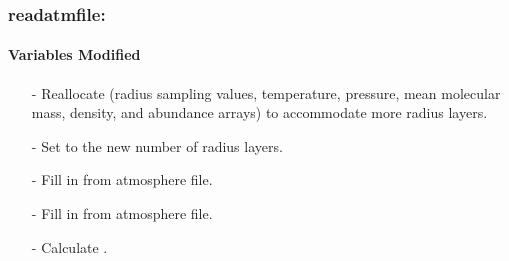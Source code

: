 \documentclass[letterpaper,12pt]{article}
\begin{document}
\subsubsection{readatmfile:}
\paragraph{Variables Modified}
\begin{enumerate}[leftmargin=10pt, noitemsep, parsep=0pt, topsep=0ex]
\item[-] Reallocate  (radius sampling values, temperature, pressure, mean molecular mass, density, and abundance arrays) to accommodate more radius layers.
\item[-] Set  to the new number of radius layers.
\item[-] Fill in  from atmosphere file.
\item[-] Fill in  from atmosphere file.
\item[-] Calculate .
\end{enumerate}
\end{document}
